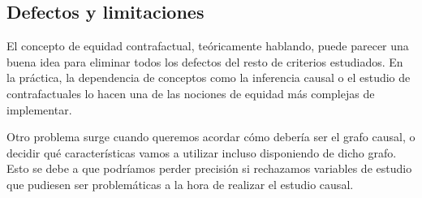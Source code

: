 \documentclass[oneside,openright,titlepage,numbers=noenddot,openany,headinclude,footinclude=true,
cleardoublepage=empty,abstractoff,BCOR=5mm,paper=a4,fontsize=12pt,main=spanish]{scrreprt}
\begin{document}

\subsection*{Defectos y limitaciones}

El concepto de equidad contrafactual, teóricamente hablando, puede parecer una buena idea para eliminar todos los defectos del resto de criterios estudiados. En la práctica, la dependencia de conceptos como la inferencia causal o el estudio de contrafactuales lo hacen una de las nociones de equidad más complejas de implementar. 

Otro problema surge cuando queremos acordar cómo debería ser el grafo causal, o decidir qué características vamos a utilizar incluso disponiendo de dicho grafo. Esto se debe a que podríamos perder precisión si rechazamos variables de estudio que pudiesen ser problemáticas a la hora de realizar el estudio causal.

\end{document}
